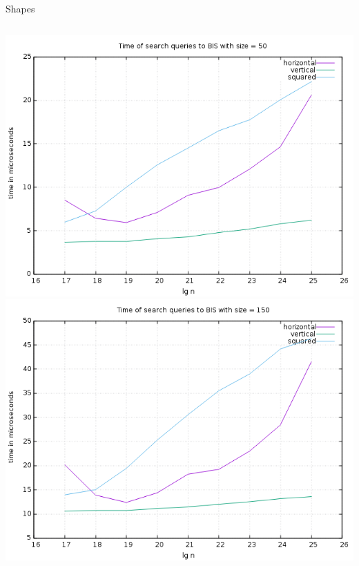 \documentclass[pdf]{beamer}
\begin{document}
\begin{frame}{Shapes}
  \begin{columns}
    \includegraphics[scale=0.32]{pictures/analysis/smalls/all_50.png}
    \includegraphics[scale=0.32]{pictures/analysis/smalls/all_150.png}
  \end{columns}
\end{frame}
\end{document}
